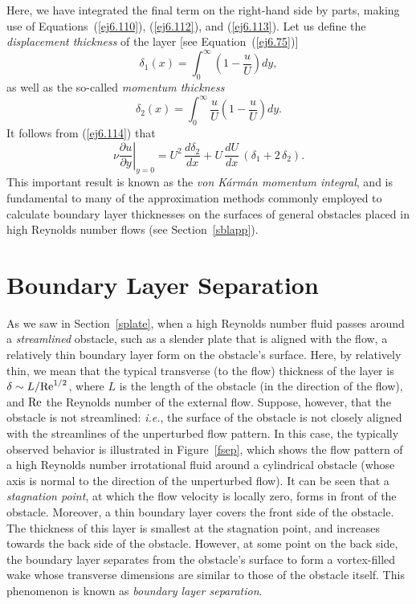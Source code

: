 Here, we have integrated the final term on the right-hand side by parts, making use of Equations~(\ref{ej6.110}), (\ref{ej6.112}), and (\ref{ej6.113}). 
Let us define the {\em displacement thickness}\/ of the layer [see Equation~(\ref{ej6.75})]
\begin{equation}\label{ej6.115}
\delta_1(x) = \int_0^\infty \left(1-\frac{u}{U}\right)dy,
\end{equation}
as well as the so-called {\em momentum thickness}
\begin{equation}\label{ej6.116}
\delta_2(x) = \int_0^\infty \frac{u}{U}\left(1-\frac{u}{U}\right)dy.
\end{equation}
It follows from (\ref{ej6.114}) that
\begin{equation}\label{ej6.117}
\nu\left.\frac{\partial u}{\partial y}\right|_{y=0} = U^2\,\frac{d\delta_2}{dx} + U\,\frac{dU}{dx}\,(\delta_1+2\,\delta_2).
\end{equation}
This important result is known as the {\em von K\'{a}rm\'{a}n momentum integral}, and is fundamental to 
many of the approximation methods commonly employed to calculate boundary layer thicknesses on the surfaces of general obstacles
placed in high Reynolds number flows (see Section~\ref{sblapp}).

\section{Boundary Layer Separation}\label{sblsep}
As we saw in Section~\ref{splate}, when a high Reynolds number fluid
passes around a {\em streamlined}\/ obstacle, such as a slender plate that is aligned with the flow, a relatively thin boundary layer
form on the obstacle's surface. Here, by relatively thin, we
mean that the typical transverse (to the flow) thickness of the layer  is $\delta\sim L/{\rm Re}^{1/2}$, 
where $L$ is the length of the obstacle (in the direction of the flow), and ${\rm Re}$  the Reynolds number of
the external flow. Suppose, however, that the obstacle is not streamlined: {\em i.e.},  the surface of the
obstacle is not closely aligned with the streamlines of the unperturbed flow pattern. 
In this case, the typically observed behavior  is illustrated in Figure~\ref{fsep}, which
shows the flow pattern of a high Reynolds number irrotational fluid around a cylindrical obstacle (whose axis is normal
to the direction of the unperturbed flow). It can be seen that a {\em stagnation point}, at which the flow velocity is locally
zero, forms in front of the obstacle.  Moreover, a thin boundary layer covers the front side of the obstacle. The thickness of this
layer is smallest at the stagnation point, and increases towards the back side of the obstacle. However, at some point on
the back side, the boundary layer separates from the obstacle's surface to form a vortex-filled wake whose transverse dimensions
are similar to those of the obstacle itself. This phenomenon is known as {\em boundary layer separation}. 

